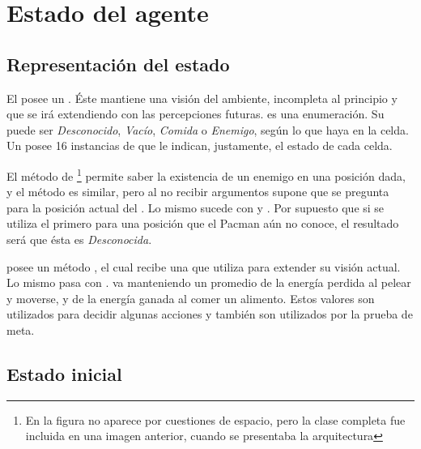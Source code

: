 \section{Estado del agente}

\subsection{Representación del estado}

El  posee un . Éste mantiene una visión del
ambiente, incompleta al principio y que se irá extendiendo con las percepciones
futuras.   es una enumeración. Su  puede ser
\emph{Desconocido}, \emph{Vacío}, \emph{Comida} o \emph{Enemigo}, según lo que
haya en la celda. Un  posee 16 instancias de 
que le indican, justamente, el estado de cada celda.

El método  de \footnote{En la
figura no aparece por cuestiones de espacio, pero la clase completa fue
incluida en una imagen anterior, cuando se presentaba la arquitectura} permite
saber la existencia de un enemigo en una posición dada, y el método
 es similar, pero al no recibir argumentos supone que se
pregunta para la posición actual del . Lo mismo sucede con
 y . Por supuesto que si se
utiliza el primero para una posición que el Pacman aún no conoce, el resultado
será que ésta es \emph{Desconocida}.

 posee un método , el cual recibe una
 que utiliza para extender su visión actual. Lo mismo pasa
con .  va manteniendo un promedio de la
energía perdida al pelear y moverse, y de la energía ganada al comer un
alimento. Estos valores son utilizados para decidir algunas acciones y también
son utilizados por la prueba de meta.

\subsection{Estado inicial}

